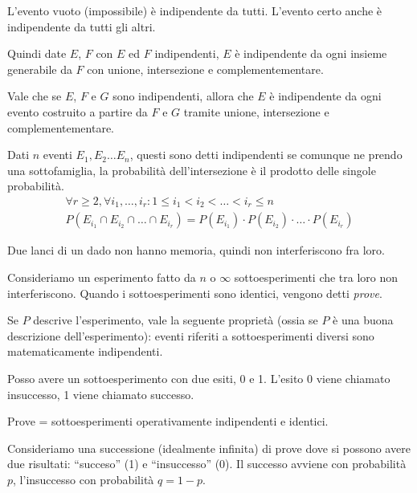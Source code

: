 L'evento vuoto (impossibile) \`e indipendente da tutti. L'evento certo anche \`e indipendente da tutti gli altri.

Quindi date $E$, $F$ con $E$ ed $F$ indipendenti, $E$ \`e indipendente da ogni insieme generabile da $F$ con unione, intersezione e complementementare.

Vale che se $E$, $F$ e $G$ sono indipendenti, allora che $E$ \`e indipendente da ogni evento costruito a partire da $F$ e $G$ tramite unione, intersezione e complementementare.

\begin{defn}
Dati $n$ eventi $E_1, E_2 \dots E_n$, questi sono detti indipendenti se comunque ne prendo una sottofamiglia, la probabilit\`a dell'intersezione \`e il prodotto delle singole probabilit\`a.
\begin{gather*}
\forall r \ge 2, \forall i_1, \dots, i_r : 1 \le i_1 < i_2 < \ldots < i_r \le n \\ P \left( E_{i_1} \cap E_{i_2} \cap \ldots \cap E_{i_r} \right) = P(E_{i_1}) \cdot P(E_{i_2}) \cdot \ldots \cdot P(E_{i_r})
\end{gather*}
\end{defn}

Due lanci di un dado non hanno memoria, quindi non interferiscono fra loro.

Consideriamo un esperimento fatto da $n$ o $\infty$ sottoesperimenti che tra loro non interferiscono. Quando i sottoesperimenti sono identici, vengono detti \emph{prove}.

Se $P$ descrive l'esperimento, vale la seguente propriet\`a (ossia se $P$ \`e una buona descrizione dell'esperimento): eventi riferiti a sottoesperimenti diversi sono matematicamente indipendenti.

Posso avere un sottoesperimento con due esiti, 0 e 1. L'esito 0 viene chiamato insuccesso, 1 viene chiamato successo.

Prove = sottoesperimenti operativamente indipendenti e identici.

Consideriamo una successione (idealmente infinita) di prove dove si possono avere due risultati: ``succeso'' (1) e ``insuccesso'' (0). Il successo avviene con probabilit\`a $p$, l'insuccesso con probabilit\`a $q = 1 - p$.

